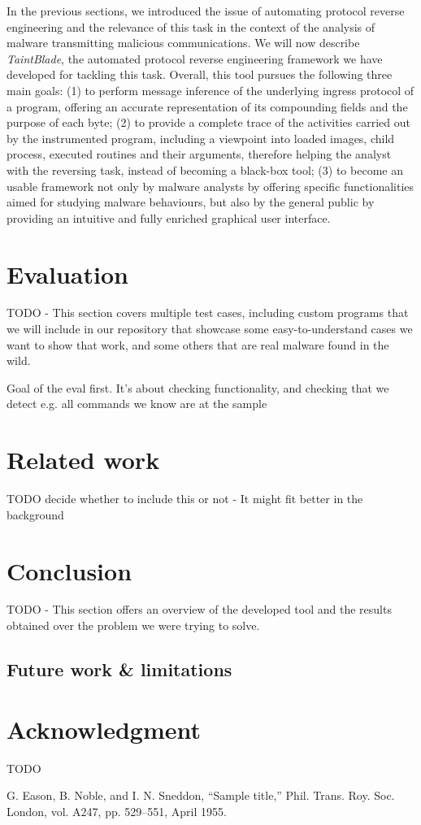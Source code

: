 \documentclass[conference]{IEEEtran}
\begin{document}
In the previous sections, we introduced the issue of automating protocol reverse engineering and the relevance of this
task in the context of the analysis of malware transmitting malicious communications. We will now describe \textit{TaintBlade}, 
the automated protocol reverse engineering framework we have developed for tackling this task. Overall, this tool pursues the following three main goals:
(1) to perform message inference of the underlying ingress protocol of a program, offering an accurate representation of its compounding fields and the purpose of each byte;
(2) to provide a complete trace of the activities carried out by the instrumented program, including a viewpoint into loaded images, child process, executed routines and their arguments, 
therefore helping the analyst with the reversing task, instead of becoming a black-box tool;
(3) to become an usable framework not only by malware analysts by offering specific functionalities aimed for studying malware behaviours, but also by the general public
by providing an intuitive and fully enriched graphical user interface.



\section{Evaluation}
TODO - This section covers multiple test cases, including custom programs that we will include in our repository that showcase
some easy-to-understand cases we want to show that work, and some others that are real malware found in the wild.

Goal of the eval first. It's about checking functionality, and checking that we detect e.g. all commands we know are at the sample

\section{Related work}
TODO decide whether to include this or not - It might fit better in the background

\section{Conclusion}
TODO - This section offers an overview of the developed tool and the results obtained over the problem we were trying to solve.

\subsection{Future work \& limitations}

\section*{Acknowledgment}
TODO

\begin{thebibliography}{00}
 G. Eason, B. Noble, and I. N. Sneddon, ``Sample title,'' Phil. Trans. Roy. Soc. London, vol. A247, pp. 529--551, April 1955.
\end{thebibliography}
\vspace{12pt}
\end{document}

